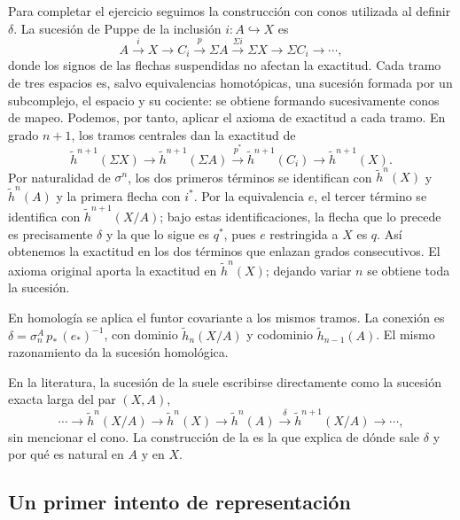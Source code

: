 \begin{sol}
Para completar el ejercicio seguimos la construcción con conos utilizada al definir $\delta$. La sucesión de Puppe de la inclusión $i\colon A\hookrightarrow X$ es
\[
A\xrightarrow{i}X\longrightarrow C_i\xrightarrow{p}\Sigma A
\xrightarrow{\Sigma i}\Sigma X\longrightarrow\Sigma C_i\longrightarrow\cdots,
\]
donde los signos de las flechas suspendidas no afectan la exactitud. Cada tramo de tres espacios es, salvo equivalencias homotópicas, una sucesión formada por un subcomplejo, el espacio y su cociente: se obtiene formando sucesivamente conos de mapeo. Podemos, por tanto, aplicar el axioma de exactitud a cada tramo. En grado $n+1$, los tramos centrales dan la exactitud de
\[
\tilde h^{n+1}(\Sigma X)\longrightarrow\tilde h^{n+1}(\Sigma A)
\xrightarrow{p^*}\tilde h^{n+1}(C_i)\longrightarrow\tilde h^{n+1}(X).
\]
Por naturalidad de $\sigma^n$, los dos primeros términos se identifican con $\tilde h^n(X)$ y $\tilde h^n(A)$ y la primera flecha con $i^*$. Por la equivalencia $e$, el tercer término se identifica con $\tilde h^{n+1}(X/A)$; bajo estas identificaciones, la flecha que lo precede es precisamente $\delta$ y la que lo sigue es $q^*$, pues $e$ restringida a $X$ es $q$. Así obtenemos la exactitud en los dos términos que enlazan grados consecutivos. El axioma original aporta la exactitud en $\tilde h^n(X)$; dejando variar $n$ se obtiene toda la sucesión.

En homología se aplica el funtor covariante a los mismos tramos. La conexión es $\delta=\sigma_n^A\,p_*\,(e_*)^{-1}$, con dominio $\tilde h_n(X/A)$ y codominio $\tilde h_{n-1}(A)$. El mismo razonamiento da la sucesión homológica.
\end{sol}

\begin{nota}
   En la literatura, la sucesión de la  suele escribirse directamente como la sucesión exacta larga del par $(X,A)$,
   \[
   \cdots\to\tilde h^n(X/A)\to\tilde h^n(X)\to\tilde h^n(A)\xrightarrow{\delta}\tilde h^{n+1}(X/A)\to\cdots,
   \]
   sin mencionar el cono. La construcción de la  es la que explica de dónde sale $\delta$ y por qué es natural en $A$ y en $X$.
\end{nota}

\subsection{Un primer intento de representación}

